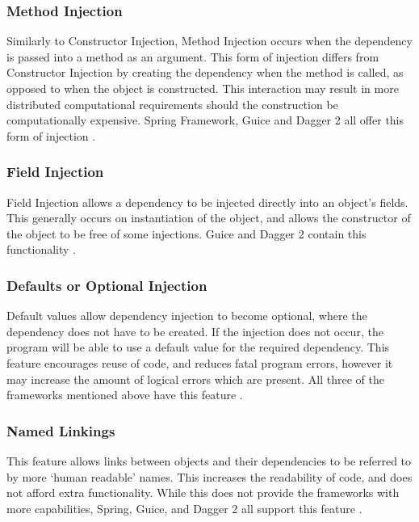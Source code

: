 \documentclass[12pt,twocolumn]{IEEEtran}
\begin{document}
\subsubsection{Method Injection} %

Similarly to Constructor Injection, Method Injection occurs when the dependency is passed into a method as an argument. This form of injection differs from Constructor Injection by creating the dependency when the method is called, as opposed to when the object is constructed. This interaction may result in more distributed computational requirements should the construction be computationally expensive. Spring Framework, Guice and Dagger 2 all offer this form of injection \cite{guicewiki2014,spring2019,dagger2019}. 

\subsubsection{Field Injection} %

Field Injection allows a dependency to be injected directly into an object's fields. This generally occurs on instantiation of the object, and allows the constructor of the object to be free of some injections. Guice and Dagger 2 contain this functionality \cite{guicewiki2014,dagger2019}.

\subsubsection{Defaults or Optional Injection} %
Default values allow dependency injection to become optional, where the dependency does not have to be created. If the injection does not occur, the program will be able to use a default value for the required dependency. This feature encourages reuse of code, and reduces fatal program errors, however it may increase the amount of logical errors which are present. All three of the frameworks mentioned above have this feature \cite{guicewiki2014,spring2019,dagger2019}.

\subsubsection{Named Linkings} %
This feature allows links between objects and their dependencies to be referred to by more `human readable' names. This increases the readability of code, and does not afford extra functionality. While this does not provide the frameworks with more capabilities, Spring, Guice, and Dagger 2 all support this feature \cite{guicewiki2014,spring2019,dagger2019}.
\end{document}

